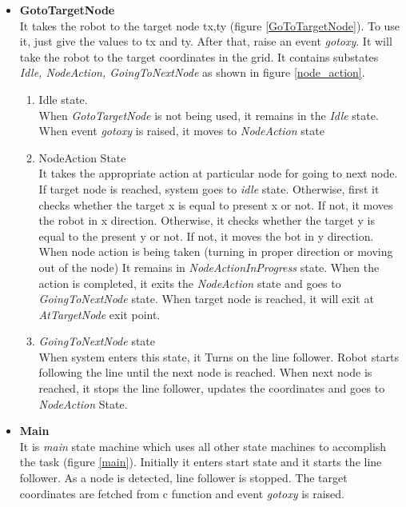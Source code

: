 \documentclass[a4paper,12pt,oneside]{book}
\begin{document}
\begin{itemize}
\item \textbf{GotoTargetNode}\\
It takes the robot to the target node tx,ty (figure \ref{GoToTargetNode}). To use it, just give the values to tx and ty. After that, raise an event \textit{gotoxy}. It will take the robot to the target coordinates in the grid. It contains substates 
	 \textit{Idle, NodeAction, GoingToNextNode} as shown in figure \ref{node_action}. 
\begin{enumerate}
\item  Idle state.\\
When \textit{GotoTargetNode} is not being used, it remains in the \textit{Idle} state. When event \textit{gotoxy} is raised, it moves to \textit{NodeAction} state
\item NodeAction State\\
It takes the appropriate action at particular node for going to next node. If target node is reached, system goes to \textit{idle} state. Otherwise, first it checks whether the target x is equal to present x or not. If not, it moves the robot in x direction. Otherwise, it checks whether the target y is equal to the present y or not. If not, it moves the bot in y direction. When node action is being taken (turning in proper direction or moving out of the node) It remains in \textit{NodeActionInProgress} state. When the action is completed, it exits the \textit{NodeAction} state and goes to \textit{GoingToNextNode} state. When target node is reached, it will exit at \textit{AtTargetNode} exit point. 
\item \textit{GoingToNextNode} state\\
When system enters this state, it Turns on the line follower. Robot starts following the line until the next node is reached. When next node is reached, it stops the line follower, updates the coordinates and goes to \textit{NodeAction} State.
\end{enumerate}
\item \textbf{Main}\\ 
It is \textit{main} state machine which uses all other state machines to accomplish the task (figure \ref{main}). Initially it enters start state and it starts the line follower. As a node is detected, line follower is stopped. The target coordinates are fetched from c function and event \textit{gotoxy} is raised.
	\begin{figure}[]
	\centering

\end{figure}
\end{itemize}
\end{document}

